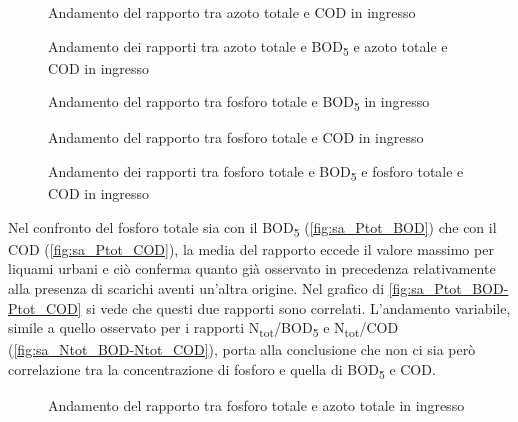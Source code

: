 \begin{figure}[H]
	\centering
	\caption{Andamento del rapporto tra azoto totale e COD in ingresso}
	\label{fig:sa_Ntot_COD}
\end{figure}
\begin{figure}[H]
	\centering
	\caption{Andamento dei rapporti tra azoto totale e BOD\textsubscript{5} e azoto totale e COD in ingresso}
	\label{fig:sa_Ntot_BOD-Ntot_COD}
\end{figure}
\begin{figure}[H]
	\centering
	\caption{Andamento del rapporto tra fosforo totale e BOD\textsubscript{5} in ingresso}
	\label{fig:sa_Ptot_BOD}
\end{figure}
\begin{figure}[H]
	\centering
	\caption{Andamento del rapporto tra fosforo totale e COD in ingresso}
	\label{fig:sa_Ptot_COD}
\end{figure}
\begin{figure}[H]
	\centering
	\caption{Andamento dei rapporti tra fosforo totale e BOD\textsubscript{5} e fosforo totale e COD in ingresso}
	\label{fig:sa_Ptot_BOD-Ptot_COD}
\end{figure}

Nel confronto del fosforo totale sia con il BOD\textsubscript{5} (\autoref{fig:sa_Ptot_BOD}) che con il COD (\autoref{fig:sa_Ptot_COD}), la media del rapporto eccede il valore massimo per liquami urbani e ciò conferma quanto già osservato in precedenza relativamente alla presenza di scarichi aventi un'altra origine.
Nel grafico di \autoref{fig:sa_Ptot_BOD-Ptot_COD} si vede che questi due rapporti sono correlati.
L’andamento variabile, simile a quello osservato per i rapporti N\textsubscript{tot}/BOD\textsubscript{5} e N\textsubscript{tot}/COD (\autoref{fig:sa_Ntot_BOD-Ntot_COD}), porta alla conclusione che non ci sia però correlazione tra la concentrazione di fosforo e quella di BOD\textsubscript{5} e COD.

\begin{figure}[H]
	\centering
	\caption{Andamento del rapporto tra fosforo totale e azoto totale in ingresso}
	\label{fig:sa_Ptot_Ntot}
\end{figure}

